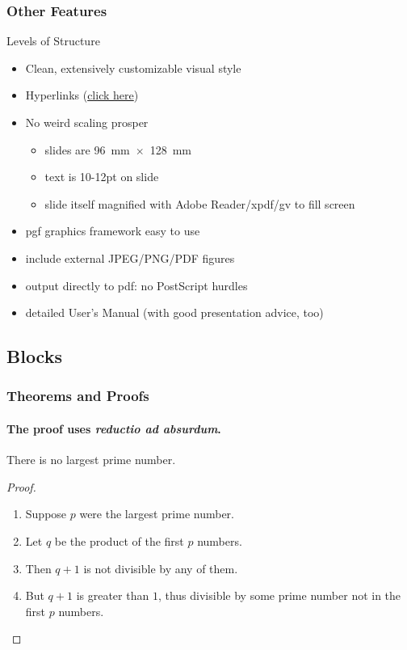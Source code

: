 \documentclass[11pt]{beamer}
\begin{document}
\begin{frame}
  \frametitle{Other Features}

  \begin{block}{Levels of Structure}
    \begin{itemize}
    \item Clean, extensively customizable visual style
      
    \item Hyperlinks (\href{http://github.com/izahn/iqss-beamer-theme}{click here}) 
      \item No weird scaling prosper
      \begin{itemize}
        \item slides are 96~mm~$\times$~128~mm
        
        \item text is 10-12pt on slide
        
        \item slide itself magnified with Adobe Reader/xpdf/gv to fill screen
      \end{itemize}
      
      \item pgf graphics framework easy to use
      
      \item include external JPEG/PNG/PDF figures
      
      \item output directly to pdf: no PostScript hurdles
      
      \item detailed User's Manual (with good presentation advice, too)
    \end{itemize}
  \end{block}
\end{frame}

\subsection{Blocks}

\begin{frame}
\frametitle{Theorems and Proofs}
\framesubtitle{The proof uses \textit{reductio ad absurdum}.}
\begin{theorem}
There is no largest prime number.
\end{theorem}
\begin{proof}
\begin{enumerate}
\item<1-| alert@1> Suppose $p$ were the largest prime number.
\item<2-> Let $q$ be the product of the first $p$ numbers.
\item<3-> Then $q+1$ is not divisible by any of them.
\item<1-> But $q + 1$ is greater than $1$, thus divisible by some prime
number not in the first $p$ numbers.\qedhere
\end{enumerate}
\end{proof}
\end{frame}
\end{document}
